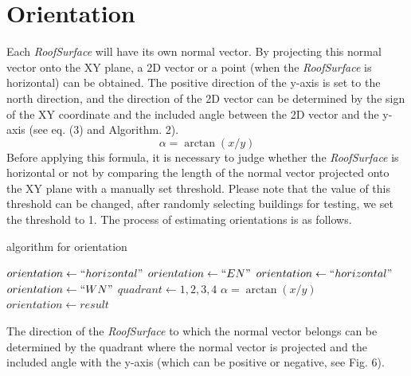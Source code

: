 \documentclass[12pt]{article}
\begin{document}
\section{Orientation}

Each \textit{RoofSurface} will have its own normal vector. By projecting this normal vector onto the XY plane, a 2D vector or a point (when the \textit{RoofSurface} is horizontal) can be obtained. The positive direction of the y-axis is set to the north direction, and the direction of the 2D vector can be determined by the sign of the XY coordinate and the included angle between the 2D vector and the y-axis (see eq. (3) and Algorithm. 2).
\begin{equation} %
     \alpha = \arctan \left ( x/  y \right )
\end{equation}
Before applying this formula, it is necessary to judge whether the \textit{RoofSurface} is horizontal or not by comparing the length of the normal vector projected onto the XY plane with a manually set threshold. Please note that the value of this threshold can be changed, after randomly selecting buildings for testing, we set the threshold to 1. The process of estimating orientations is as follows.
\begin{algorithm}[ht]
\begin{algorithmic}
\caption{algorithm for orientation}
    \State $orientation\gets ``horizontal"$
\Else
            \State $orientation\gets ``EN"$
        \Else
                \State $orientation\gets ``horizontal"$
            \Else
                \State $orientation\gets ``WN"$
            \EndIf
        \EndIf
    \Else {}
        \State $quadrant\gets 1,2,3,4$ 
        \State $\alpha = \arctan \left ( x/  y \right )$
        \State $orientation\gets result$ 
    \EndIf
\EndIf
\end{algorithmic}
\end{algorithm}
The direction of the \textit{RoofSurface} to which the normal vector belongs can be determined by the quadrant where the normal vector is projected and the included angle with the y-axis (which can be positive or negative, see Fig. 6).
\end{document}
